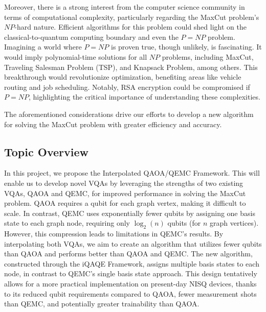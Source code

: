 Moreover, there is a strong interest from the computer science community in terms of computational complexity, particularly regarding the MaxCut problem's $NP$-hard nature. Efficient algorithms for this problem could shed light on the classical-to-quantum computing boundary and even the $P = NP$ problem. Imagining a world where $P = NP$ is proven true, though unlikely, is fascinating. It would imply polynomial-time solutions for all $NP$ problems, including MaxCut, Traveling Salesman Problem (TSP), and Knapsack Problem, among others. This breakthrough would revolutionize optimization, benefiting areas like vehicle routing and job scheduling. Notably, RSA encryption could be compromised if $P = NP$, highlighting the critical importance of understanding these complexities.

The aforementioned considerations drive our efforts to develop a new algorithm for solving the MaxCut problem with greater efficiency and accuracy.

\subsection{Topic Overview}
\label{section:overview}
In this project, we propose the Interpolated QAOA/QEMC Framework. This will enable us to develop novel VQAs by leveraging the strengths of two existing VQAs, QAOA and QEMC, for improved performance in solving the MaxCut problem. QAOA requires a qubit for each graph vertex, making it difficult to scale. In contrast, QEMC uses exponentially fewer qubits by assigning one basis state to each graph node, requiring only $\log_2(n)$ qubits (for $n$ graph vertices). However, this compression leads to limitations in QEMC's results. By interpolating both VQAs, we aim to create an algorithm that utilizes fewer qubits than QAOA and performs better than QAOA and QEMC. The new algorithm, constructed through the iQAQE Framework, assigns multiple basis states to each node, in contrast to QEMC's single basis state approach. This design tentatively allows for a more practical implementation on present-day NISQ devices, thanks to its reduced qubit requirements compared to QAOA, fewer measurement shots than QEMC, and potentially greater trainability than QAOA.

